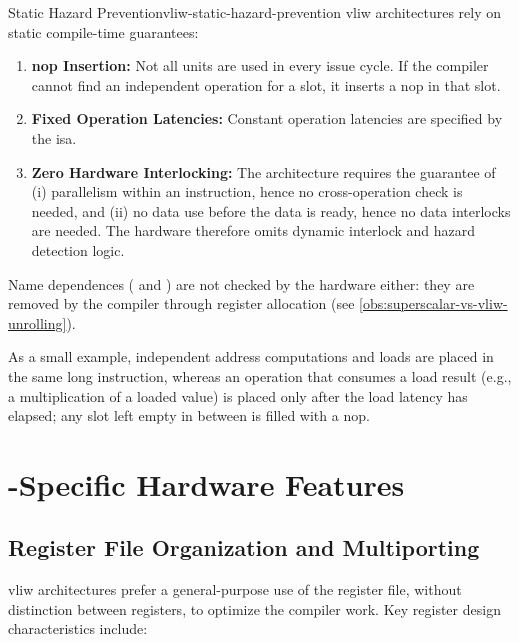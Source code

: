 \begin{concept}{Static Hazard Prevention}{vliw-static-hazard-prevention}
    \gls{vliw} architectures rely on static compile-time guarantees:
    \begin{enumerate}
        \item \textbf{\gls{nop} Insertion:} Not all units are used in every issue cycle. If the compiler cannot find an independent operation for a slot, it inserts a \gls{nop} in that slot.
        \item \textbf{Fixed Operation Latencies:} Constant operation latencies are specified by the \gls{isa}.
        \item \textbf{Zero Hardware Interlocking:} The architecture requires the guarantee of (i) parallelism within an instruction, hence no cross-operation  check is needed, and (ii) no data use before the data is ready, hence no data interlocks are needed. The hardware therefore omits dynamic interlock and hazard detection logic.
    \end{enumerate}
    Name dependences ( and ) are not checked by the hardware either: they are removed by the compiler through register allocation (see \cref{obs:superscalar-vs-vliw-unrolling}).
\end{concept}

As a small example, independent address computations and loads are placed in the same long instruction, whereas an operation that consumes a load result (e.g., a multiplication of a loaded value) is placed only after the load latency has elapsed; any slot left empty in between is filled with a \gls{nop}.

\section{-Specific Hardware Features}
\label{sec:vliw_hardware_features}

\subsection{Register File Organization and Multiporting}

\gls{vliw} architectures prefer a general-purpose use of the register file, without distinction between registers, to optimize the compiler work. Key register design characteristics include:

